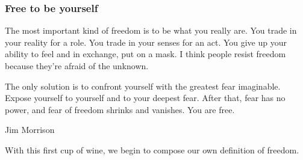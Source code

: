 {  \subsubsection*{Free to be yourself}
  \newReading The most important kind of freedom is to be what you really are.
  You trade in your reality for a role. You trade in your senses for an act. You
  give up your ability to feel and in exchange, put on a mask. I think people
  resist freedom because they're afraid of the unknown.

  The only solution is to confront yourself with the greatest fear imaginable.
  Expose yourself to yourself and to your deepest fear. After that, fear has no
  power, and fear of freedom shrinks and vanishes. You are free.

  \textemdash{}Jim Morrison

  With this first cup of wine, we begin to compose our own definition of
  freedom.


}

\newcommand{\wineSecondCup}{
  \newReading With this second cup of wine, we contemplate different ways to
  view freedom in our lifestyles.

  \subsubsection*{The Monk and the Minister}
  Two close boyhood friends grow up and go their separate ways.  One becomes a
  humble monk, the other a rich and powerful minister to the king.

  Years later they meet.  As they catch up, the minister (in his fine robes)
  takes pity on the thin, shabby monk.  Seeking to help, he says: ``You know, if
  you could learn to cater to the king you wouldn't have to live on rice and
  beans.''

  To which the monk replies: ``If you could learn to live on rice and beans, you
  wouldn't have to cater to the king.''

  \newReading While most of us fall somewhere between these two examples,
  they provide a spectrum on which to consider freedom.

  Forming business deals or other contracts, and making family or personal
  promises are actions we take freely that can bring great happiness, but at the
  same time they limit our freedom to follow other pursuits by binding us to
  those obligations.

  For this second cup of wine, we ask ourselves: Is my view of freedom closer to
  the monk, or to the minister? And are my choices and actions leading me
  towards or away from that goal?
}

